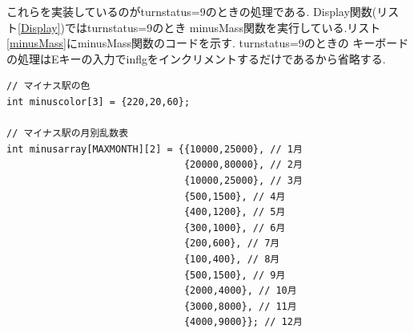 \documentclass[a4j]{jarticle}
\begin{document}
        これらを実装しているのがturnstatus=9のときの処理である. Display関数(リスト\ref{Display})ではturnstatus=9のとき
        minusMass関数を実行している.リスト\ref{minusMass}にminusMass関数のコードを示す. turnstatus=9のときの
        キーボードの処理はEキーの入力でinflgをインクリメントするだけであるから省略する.
        \begin{lstlisting}[basicstyle=\ttfamily\footnotesize, frame=single,label=minusMass,caption=minusMass関数]
// マイナス駅の色
int minuscolor[3] = {220,20,60};

// マイナス駅の月別乱数表
int minusarray[MAXMONTH][2] = {{10000,25000}, // 1月
                               {20000,80000}, // 2月
                               {10000,25000}, // 3月
                               {500,1500}, // 4月
                               {400,1200}, // 5月
                               {300,1000}, // 6月
                               {200,600}, // 7月
                               {100,400}, // 8月
                               {500,1500}, // 9月
                               {2000,4000}, // 10月
                               {3000,8000}, // 11月
                               {4000,9000}}; // 12月


\end{lstlisting}
\end{document}

